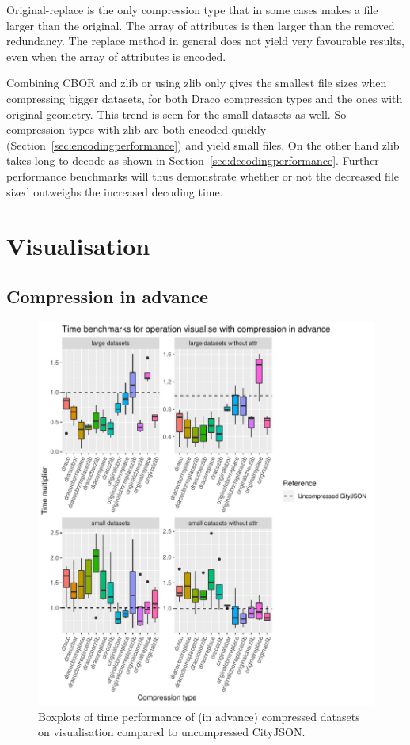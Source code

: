 Original-replace is the only compression type that in some cases makes a file larger than the original.
The array of attributes is then larger than the removed redundancy.
The replace method in general does not yield very favourable results, even when the array of attributes is encoded.

Combining CBOR and zlib or using zlib only gives the smallest file sizes when compressing bigger datasets, for both Draco compression types and the ones with original geometry.
This trend is seen for the small datasets as well.
So compression types with zlib are both encoded quickly (Section~\ref{sec:encodingperformance}) and yield small files.
On the other hand zlib takes long to decode as shown in Section~\ref{sec:decodingperformance}.
Further performance benchmarks will thus demonstrate whether or not the decreased file sized outweighs the increased decoding time.








\newpage
\section{Visualisation}
\label{bmvisualisation}

\subsection{Compression in advance}

\begin{figure}[h!]
    \includegraphics[scale=0.88]{figs/benchmark/individual/visualise.pdf}
    \caption{Boxplots of time performance of (in advance) compressed datasets on visualisation compared to uncompressed CityJSON.}
    \label{fig:sdvis}
\end{figure}


